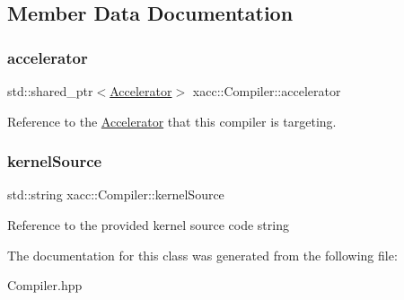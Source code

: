 \subsection{Member Data Documentation}
\mbox{\label{a01629_ad4cbb467fa7e377bac6c054ffcb22b7c}} 
\subsubsection{\texorpdfstring{accelerator}{accelerator}}
{\footnotesize\ttfamily std\+::shared\+\_\+ptr$<$\hyperlink{a01613}{Accelerator}$>$ xacc\+::\+Compiler\+::accelerator\hspace{0.3cm}{\ttfamily [protected]}}

Reference to the \hyperlink{a01613}{Accelerator} that this compiler is targeting. \mbox{\label{a01629_a0ad81c816c09e5113d03cdc02165c453}} 
\subsubsection{\texorpdfstring{kernel\+Source}{kernelSource}}
{\footnotesize\ttfamily std\+::string xacc\+::\+Compiler\+::kernel\+Source\hspace{0.3cm}{\ttfamily [protected]}}

Reference to the provided kernel source code string 

The documentation for this class was generated from the following file\+:\begin{DoxyCompactItemize}
\item 
Compiler.\+hpp\end{DoxyCompactItemize}
